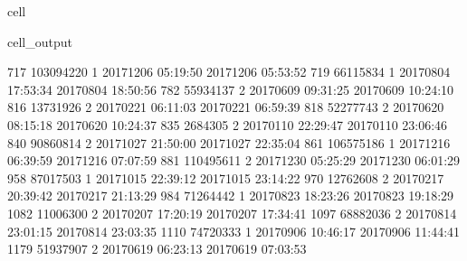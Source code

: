 \documentclass[letterpaper,10pt,english]{sphinxmanual}
\begin{document}
\begin{sphinxuseclass}{cell}
\begin{sphinxuseclass}{cell_output}
\begin{sphinxVerbatim}[commandchars=\\\{\}]
717    103094220         1  2017\PYGZhy{}12\PYGZhy{}06 05:19:50   2017\PYGZhy{}12\PYGZhy{}06 05:53:52   
719     66115834         1  2017\PYGZhy{}08\PYGZhy{}04 17:53:34   2017\PYGZhy{}08\PYGZhy{}04 18:50:56   
782     55934137         2  2017\PYGZhy{}06\PYGZhy{}09 09:31:25   2017\PYGZhy{}06\PYGZhy{}09 10:24:10   
816     13731926         2  2017\PYGZhy{}02\PYGZhy{}21 06:11:03   2017\PYGZhy{}02\PYGZhy{}21 06:59:39   
818     52277743         2  2017\PYGZhy{}06\PYGZhy{}20 08:15:18   2017\PYGZhy{}06\PYGZhy{}20 10:24:37   
835      2684305         2  2017\PYGZhy{}01\PYGZhy{}10 22:29:47   2017\PYGZhy{}01\PYGZhy{}10 23:06:46   
840     90860814         2  2017\PYGZhy{}10\PYGZhy{}27 21:50:00   2017\PYGZhy{}10\PYGZhy{}27 22:35:04   
861    106575186         1  2017\PYGZhy{}12\PYGZhy{}16 06:39:59   2017\PYGZhy{}12\PYGZhy{}16 07:07:59   
881    110495611         2  2017\PYGZhy{}12\PYGZhy{}30 05:25:29   2017\PYGZhy{}12\PYGZhy{}30 06:01:29   
958     87017503         1  2017\PYGZhy{}10\PYGZhy{}15 22:39:12   2017\PYGZhy{}10\PYGZhy{}15 23:14:22   
970     12762608         2  2017\PYGZhy{}02\PYGZhy{}17 20:39:42   2017\PYGZhy{}02\PYGZhy{}17 21:13:29   
984     71264442         1  2017\PYGZhy{}08\PYGZhy{}23 18:23:26   2017\PYGZhy{}08\PYGZhy{}23 19:18:29   
1082    11006300         2  2017\PYGZhy{}02\PYGZhy{}07 17:20:19   2017\PYGZhy{}02\PYGZhy{}07 17:34:41   
1097    68882036         2  2017\PYGZhy{}08\PYGZhy{}14 23:01:15   2017\PYGZhy{}08\PYGZhy{}14 23:03:35   
1110    74720333         1  2017\PYGZhy{}09\PYGZhy{}06 10:46:17   2017\PYGZhy{}09\PYGZhy{}06 11:44:41   
1179    51937907         2  2017\PYGZhy{}06\PYGZhy{}19 06:23:13   2017\PYGZhy{}06\PYGZhy{}19 07:03:53   


\end{sphinxVerbatim}
\end{sphinxuseclass}
\end{sphinxuseclass}
\end{document}
